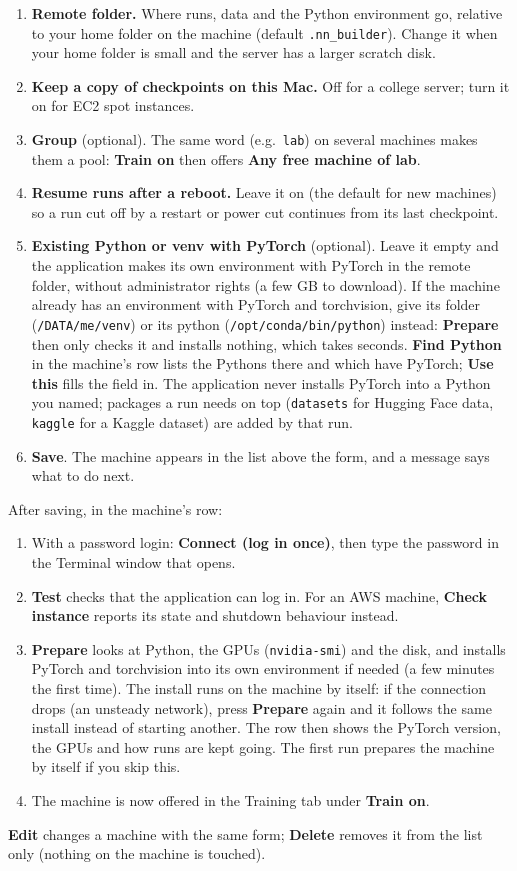 \documentclass[11pt,a4paper]{article}
\newcommand{\ui}[1]{\textbf{\textsf{#1}}}
\newcommand{\file}[1]{\texttt{#1}}
\begin{document}
\begin{enumerate}
  \item \textbf{Remote folder.} Where runs, data and the Python environment go, relative to your home folder on the machine (default
        \file{.nn\_builder}). Change it when your home folder is small and the server has a larger scratch disk.
  \item \textbf{Keep a copy of checkpoints on this Mac.} Off for a college server; turn it on for EC2 spot instances.
  \item \textbf{Group} (optional). The same word (e.g.\ \texttt{lab}) on several machines makes them a pool: \ui{Train on} then offers
        \ui{Any free machine of lab}.
  \item \textbf{Resume runs after a reboot.} Leave it on (the default for new machines) so a run cut off by a restart or power cut
        continues from its last checkpoint.
  \item \textbf{Existing Python or venv with PyTorch} (optional). Leave it empty and the application makes its own environment with
        PyTorch in the remote folder, without administrator rights (a few GB to download). If the machine already has an environment
        with PyTorch and torchvision, give its folder (\file{/DATA/me/venv}) or its python (\file{/opt/conda/bin/python}) instead:
        \ui{Prepare} then only checks it and installs nothing, which takes seconds. \ui{Find Python} in the machine's row lists the
        Pythons there and which have PyTorch; \ui{Use this} fills the field in. The application never installs PyTorch into a Python
        you named; packages a run needs on top (\texttt{datasets} for Hugging Face data, \texttt{kaggle} for a Kaggle dataset) are added
        by that run.
  \item \ui{Save}. The machine appears in the list above the form, and a message says what to do next.
\end{enumerate}

\noindent After saving, in the machine's row:
\begin{enumerate}
  \item With a password login: \ui{Connect (log in once)}, then type the password in the Terminal window that opens.
  \item \ui{Test} checks that the application can log in. For an AWS machine, \ui{Check instance} reports its state and shutdown
        behaviour instead.
  \item \ui{Prepare} looks at Python, the GPUs (\texttt{nvidia-smi}) and the disk, and installs PyTorch and torchvision into its own
        environment if needed (a few minutes the first time). The install runs on the machine by itself: if the connection drops (an
        unsteady network), press \ui{Prepare} again and it follows the same install instead of starting another. The row then shows the PyTorch version, the GPUs and how runs are kept going. The first run prepares the machine by
        itself if you skip this.
  \item The machine is now offered in the Training tab under \ui{Train on}.
\end{enumerate}
\ui{Edit} changes a machine with the same form; \ui{Delete} removes it from the list only (nothing on the machine is touched).
\end{document}
